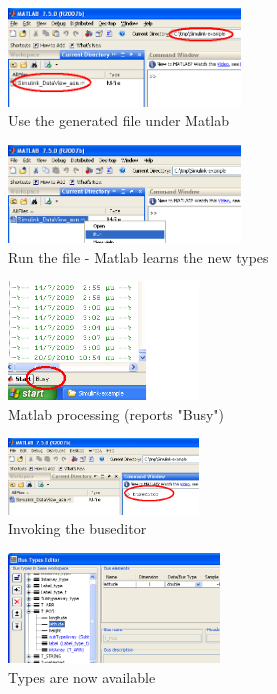 \documentclass[11pt]{book}
\begin{document}
\begin{figure}
\centering
\includegraphics[width=0.55\textwidth]{imgs/matlab1}
\caption{Use the generated file under Matlab}
\label{matlab1}
\end{figure}
\begin{figure}
\centering
\includegraphics[width=0.55\textwidth]{imgs/matlab2}
\caption{Run the file - Matlab learns the new types}
\label{matlab2}
\end{figure}
\begin{figure}
\centering
\includegraphics[width=0.45\textwidth]{imgs/matlab3}
\caption{Matlab processing (reports "Busy")}
\label{matlab3}
\end{figure}
\begin{figure}
\centering
\includegraphics[width=0.45\textwidth]{imgs/matlab4}
\caption{Invoking the buseditor}
\label{matlab4}
\end{figure}
\begin{figure}
\centering
\includegraphics[width=0.5\textwidth]{imgs/matlab5}
\caption{Types are now available}
\label{matlab5}
\end{figure}
\end{document}
